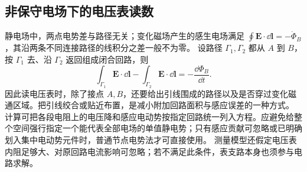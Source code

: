 \subsection{非保守电场下的电压表读数}
静电场中，两点电势差与路径无关；变化磁场产生的感生电场满足 $\oint\boldsymbol E\cdot\dd\boldsymbol l=-\dot\Phi_B$，其沿两条不同连接路径的线积分之差一般不为零。
设路径 $\Gamma_1,\Gamma_2$ 都从 $A$ 到 $B$，按 $\Gamma_1$ 去、沿 $\Gamma_2$ 返回组成闭合回路，则
\[
 \int_{\Gamma_1}\boldsymbol E\cdot\dd\boldsymbol l-
 \int_{\Gamma_2}\boldsymbol E\cdot\dd\boldsymbol l=-\frac{\dd\Phi_B}{\dd t}.
\]
因此读电压表时，除了接点 $A,B$，还要给出引线围成的路径以及是否穿过变化磁通区域。把引线绞合或贴近布置，是减小附加回路面积与感应误差的一种方式。
计算可把各段电阻上的电压降和感应电动势按指定回路统一列入方程。应避免给整个空间强行指定一个能代表全部电场的单值静电势；只有感应贡献可忽略或已明确划入集中电动势元件时，普通节点电势法才可直接使用。
测量模型还假定电压表内阻足够大、对原回路电流影响可忽略；若不满足此条件，表支路本身也须参与电路求解。

